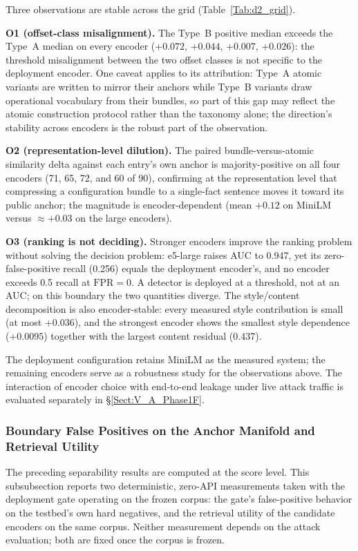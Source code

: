 \documentclass[journal]{IEEEtran}
\begin{document}
Three observations are stable across the grid (Table~\ref{Tab:d2_grid}).

\textbf{O1 (offset-class misalignment).} The Type~B positive median exceeds
the Type~A median on every encoder ($+0.072$, $+0.044$, $+0.007$, $+0.026$):
the threshold misalignment between the two offset classes is not specific to
the deployment encoder. One caveat applies to its attribution: Type~A atomic
variants are written to mirror their anchors while Type~B variants draw
operational vocabulary from their bundles, so part of this gap may reflect
the atomic construction protocol rather than the taxonomy alone; the
direction's stability across encoders is the robust part of the observation.

\textbf{O2 (representation-level dilution).} The paired bundle-versus-atomic
similarity delta against each entry's own anchor is majority-positive on all
four encoders (71, 65, 72, and 60 of 90), confirming at the representation
level that compressing a configuration bundle to a single-fact sentence moves
it toward its public anchor; the magnitude is encoder-dependent (mean
$+0.12$ on MiniLM versus $\approx{+}0.03$ on the large encoders).

\textbf{O3 (ranking is not deciding).} Stronger encoders improve the ranking
problem without solving the decision problem: e5-large raises AUC to 0.947,
yet its zero-false-positive recall (0.256) equals the deployment encoder's,
and no encoder exceeds 0.5 recall at $\mathrm{FPR}=0$. A detector is deployed
at a threshold, not at an AUC; on this boundary the two quantities diverge.
The style/content decomposition is also encoder-stable: every measured style
contribution is small (at most $+0.036$), and the strongest encoder shows the
smallest style dependence ($+0.0095$) together with the largest content
residual (0.437).

The deployment configuration retains MiniLM as the measured system; the
remaining encoders serve as a robustness study for the observations above.
The interaction of encoder choice with end-to-end leakage under live attack
traffic is evaluated separately in \S\ref{Sect:V_A_Phase1F}.


\subsubsection{Boundary False Positives on the Anchor Manifold and Retrieval Utility}
\label{Sect:V_E_4_Tier0}

The preceding separability results are computed at the score level. This
subsubsection reports two deterministic, zero-API measurements taken with the
deployment gate operating on the frozen corpus: the gate's false-positive
behavior on the testbed's own hard negatives, and the retrieval utility of the
candidate encoders on the same corpus. Neither measurement depends on the
attack evaluation; both are fixed once the corpus is frozen.
\end{document}
